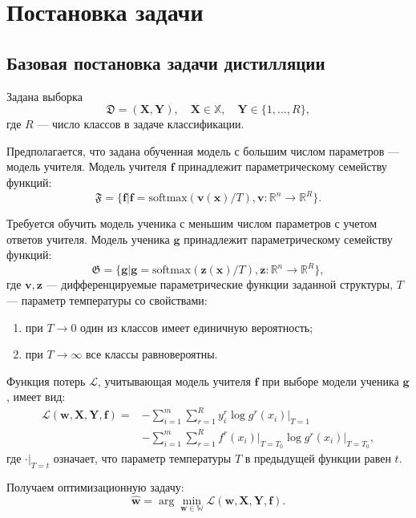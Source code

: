 \newpage

\section{Постановка задачи}

\subsection{Базовая постановка задачи дистилляции}

Задана выборка 
$$\mathfrak{D}=(\mathbf{X},\mathbf{Y}), \quad \mathbf{X} \in \mathbb{X},
\quad \mathbf{Y} \in \{1,...,R\},$$
где $R$ --- число классов в задаче классификации.

Предполагается, что задана обученная модель с большим числом параметров --- модель учителя. Модель учителя $\mathbf{f}$ принадлежит параметрическому семейству функций: $$\mathfrak{F}=\{\mathbf{f}|\mathbf{f}=\text{softmax}(\mathbf{v(x)}/T), \mathbf{v}:\mathbb{R}^{n}\rightarrow \mathbb{R}^{R}\}.$$

Требуется обучить модель ученика с меньшим числом параметров с учетом ответов учителя. Модель ученика $\mathbf{g}$ принадлежит параметрическому семейству функций: $$\mathfrak{G}=\{\mathbf{g}|\mathbf{g}=\text{softmax}(\mathbf{z(x)}/T), \mathbf{z}:\mathbb{R}^{n}\rightarrow \mathbb{R}^{R}\},$$
где $\mathbf{v, z}$ --- дифференцируемые параметрические функции заданной структуры, $T$ --- параметр температуры со свойствами:
\begin{enumerate}
    \item при $T \rightarrow 0$ один из классов имеет единичную вероятность;
    \item при $T \rightarrow \infty$ все классы равновероятны.
\end{enumerate}

Функция потерь $\mathcal{L}$, учитывающая модель учителя $\mathbf{f}$ при выборе модели ученика $\mathbf{g}$, имеет вид:
\[
\begin{aligned}
    \mathcal{L}(\mathbf{w,X,Y,f})=&-\sum\limits_{i=1}^{m}\sum\limits_{r=1}^{R}y_{i}^{r}\log{g^{r}(x_{i})}\bigr|_{T=1}\\
    &-\sum\limits_{i=1}^{m}\sum\limits_{r=1}^{R}f^{r}(x_{i})\bigr|_{T=T_{0}}\log{g^{r}(x_{i})}\bigr|_{T=T_{0}},
\end{aligned}
\]
где $\cdot\bigr|_{T=t}$ означает, что параметр температуры $T$ в предыдущей функции равен $t$.

Получаем оптимизационную задачу:
$$\hat{\mathbf{w}} = \arg\min_{\mathbf{w} \in \mathbb{W}} \mathcal{L}(\mathbf{w,X,Y,f}).$$


